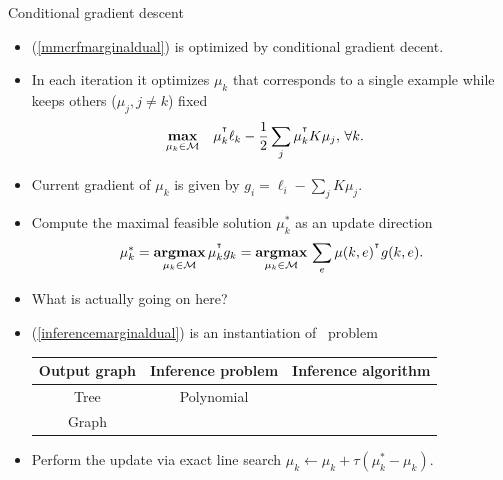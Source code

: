 \documentclass[first=dgreen,second=purple,logo=red]{aaltoslides}
\begin{document}
%
\begin{frame}{Conditional gradient descent}
	\begin{itemize}\footnotesize
		\item (\ref{mmcrfmarginaldual}) is optimized by conditional gradient decent.
		\item In each iteration it optimizes $\mu_k$ that corresponds to a single example while keeps others ($\mu_j,j\neq k$) fixed 
		\begin{align*}
			\underset{\mathbf {\mu}_k\in\mathcal{M}}{\textbf{max}} & \quad \mathbf {\mu}_k^{^{\intercal}}\ell_k - \frac{1}{2}\sum_{j}\mathbf {\mu}_k^{^{\intercal}}K\mathbf {\mu}_j, \, \forall k.
		\end{align*}
		\item Current gradient of $\mu_k$ is given by $g_i = \ell_{i}-\sum_{j}K\mu_j$.
		\item Compute the maximal feasible solution $\mu_k^*$ as an update direction
		\begin{align}
			\mu_k^* = \underset{\mu_k\in\mathcal{M}}{\textbf{argmax}} \, \mu_k^{^{\intercal}}g_k = \underset{\mu_k\in\mathcal{M}}{\textbf{argmax}} \, \sum_e\mu(k,e)^{^{\intercal}}g(k,e). \label{inferencemarginaldual}
		\end{align}
		\item What is actually going on here?
		\item (\ref{inferencemarginaldual}) is an instantiation of \map\ problem 
		\begin{tabular}{|c|c|c|}
			\hline
			\footnotesize
			 Output graph & Inference problem & Inference algorithm \\ \hline
			 Tree & Polynomial & \dpg\ \cite{Rousu07}  \\
			 Graph & \nphard & \lbp\ \cite{su10structured}  \\ \hline
		\end{tabular}
		\item Perform the update via exact line search $\mu_k \leftarrow \mu_k + \tau(\mu_k^*-\mu_k)$.
	\end{itemize}
\end{frame}
\end{document}
